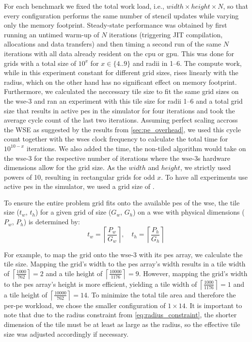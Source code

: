 For each benchmark we fixed the total work load, i.e., $width\times height\times N$, so that every configuration performs the same number of stencil updates while varying only the memory footprint. Steady-state performance was obtained by first running an untimed warm-up of $N$ iterations (triggering JIT compilation, allocations and data transfers) and then timing a second run of the same $N$ iterations with all data already resident on the \ac{cpu} or \ac{gpu}. This was done for grids with a total size of $10^x$ for $x \in \{4..9\}$ and radii in \numrange{1}{6}.
The compute work, while in this experiment constant for different grid sizes, rises linearly with the radius, which on the other hand has no significant effect on memory footprint.
Furthermore, we calculated the neccessary tile size to fit the same grid sizes on the \ac{wse}-3 and ran an experiment with this tile size for radii \numrange{1}{6} and a total grid size that results in  active \acp{pe} in the simulator for four iterations and took the average cycle count of the last two iterations.
Assuming perfect scaling accross the WSE as suggested by the results from \autoref{sec:pe_overhead}, we used this cycle count together with the \ac{wse}s clock frequency to calculate the total time for $10^{10-x}$ iterations.
We also added the time, the non-tiled algorithm would take on the \ac{wse}-3 for the respective number of iterations where the \ac{wse}-3s hardware dimensions allow for the grid size.
As the $width$ and $height$, we strictly used powers of 10, resulting in rectangular grids for odd $x$.
To have all experiments use  active \acp{pe} in the simulator, we used a grid size of .

To ensure the entire problem grid fits onto the available \acp{pe} of the \ac{wse}, the tile size ($t_w$, $t_h$) for a given grid of size ($G_w$, $G_h$) on a \ac{wse} with physical dimensions ($P_w$, $P_h$) is determined by:
\begin{equation}
    t_w = \left\lceil \frac{P_w}{G_w} \right\rceil, \quad t_h = \left\lceil \frac{P_h}{G_h} \right\rceil
\end{equation}

For example, to map the  grid onto the \ac{wse}-3 with its  \acp{pe} array, we calculate the tile size. Mapping the grid's width to the \acp{pe} array's width results in a tile width of $\left\lceil \frac{1000}{762} \right\rceil = 2$ and a tile height of $\left\lceil \frac{10000}{1176} \right\rceil = 9$. However, mapping the grid's width to the \acp{pe} array's height is more efficient, yielding a tile width of $\left\lceil \frac{1000}{1176} \right\rceil = 1$ and a tile height of $\left\lceil \frac{10000}{762} \right\rceil = 14$. To minimize the total tile area and therefore the per-\ac{pe} workload, we chose the smaller configuration of $1 \times 14$. It is important to note that due to the radius constraint from \autoref{eq:radius_constraint}, the shorter dimension of the tile must be at least as large as the radius, so the effective tile size was adjusted accordingly if necessary.

